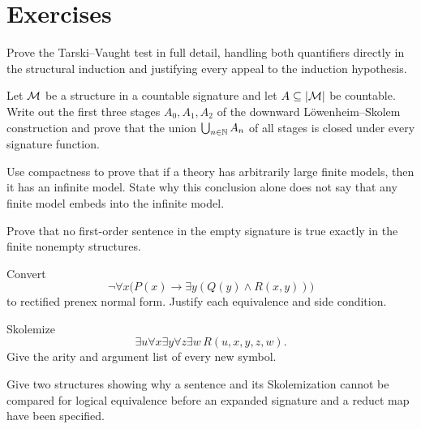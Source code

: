 \section{Exercises}
\label{sec:fol-cardinality-normalforms-06}

\begin{exercise}
\label{ex:fol-cardinality-normalforms-01}
Prove the Tarski--Vaught test in full detail, handling both quantifiers
directly in the structural induction and justifying every appeal to the
induction hypothesis.
\end{exercise}

\begin{exercise}
\label{ex:fol-cardinality-normalforms-02}
Let \(\mathcal M\) be a structure in a countable signature and let
\(A\subseteq\lvert\mathcal M\rvert\) be countable.  Write out the first three stages
\(A_0,A_1,A_2\) of the downward L\"owenheim--Skolem construction and prove
that the union \(\bigcup_{n\in\mathbb{N}}A_n\) of all stages is closed under every
signature function.
\end{exercise}

\begin{exercise}
\label{ex:fol-cardinality-normalforms-03}
Use compactness to prove that if a theory has arbitrarily large finite models,
then it has an infinite model.  State why this conclusion alone does not say
that any finite model embeds into the infinite model.
\end{exercise}

\begin{exercise}
\label{ex:fol-cardinality-normalforms-04}
Prove that no first-order sentence in the empty signature is true exactly in
the finite nonempty structures.
\end{exercise}

\begin{exercise}
\label{ex:fol-cardinality-normalforms-05}
Convert
\[
 \neg\forall x\bigl(P(x)\to\exists y(Q(y)\land R(x,y))\bigr)
\]
to rectified prenex normal form.  Justify each equivalence and side condition.
\end{exercise}

\begin{exercise}
\label{ex:fol-cardinality-normalforms-06}
Skolemize
\[
 \exists u\forall x\exists y\forall z\exists w\,
 R(u,x,y,z,w).
\]
Give the arity and argument list of every new symbol.
\end{exercise}

\begin{exercise}
\label{ex:fol-cardinality-normalforms-07}
Give two structures showing why a sentence and its Skolemization cannot be
compared for logical equivalence before an expanded signature and a reduct map
have been specified.
\end{exercise}

